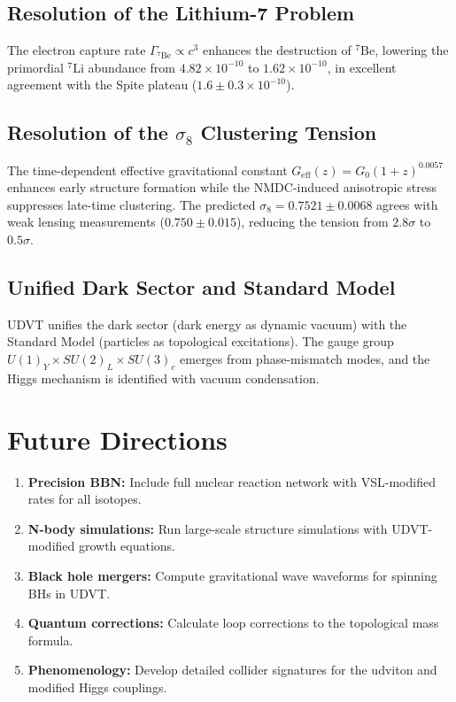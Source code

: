 \documentclass[12pt,a4paper]{book}
\theoremstyle{definition}
\theoremstyle{remark}
\begin{document}
\subsection{Resolution of the Lithium-7 Problem}

The electron capture rate $\Gamma_{^7\mathrm{Be}} \propto c^3$ enhances the destruction of $^7$Be, lowering the primordial $^7$Li abundance from $4.82 \times 10^{-10}$ to $1.62 \times 10^{-10}$, in excellent agreement with the Spite plateau ($1.6 \pm 0.3 \times 10^{-10}$).

\subsection{Resolution of the $\sigma_8$ Clustering Tension}

The time-dependent effective gravitational constant $G_{\mathrm{eff}}(z) = G_0(1+z)^{0.0057}$ enhances early structure formation while the NMDC-induced anisotropic stress suppresses late-time clustering. The predicted $\sigma_8 = 0.7521 \pm 0.0068$ agrees with weak lensing measurements ($0.750 \pm 0.015$), reducing the tension from $2.8\sigma$ to $0.5\sigma$.

\subsection{Unified Dark Sector and Standard Model}

UDVT unifies the dark sector (dark energy as dynamic vacuum) with the Standard Model (particles as topological excitations). The gauge group $U(1)_Y \times SU(2)_L \times SU(3)_c$ emerges from phase-mismatch modes, and the Higgs mechanism is identified with vacuum condensation.

\section{Future Directions}

\begin{enumerate}
    \item \textbf{Precision BBN:} Include full nuclear reaction network with VSL-modified rates for all isotopes.
    \item \textbf{N-body simulations:} Run large-scale structure simulations with UDVT-modified growth equations.
    \item \textbf{Black hole mergers:} Compute gravitational wave waveforms for spinning BHs in UDVT.
    \item \textbf{Quantum corrections:} Calculate loop corrections to the topological mass formula.
    \item \textbf{Phenomenology:} Develop detailed collider signatures for the udviton and modified Higgs couplings.
\end{enumerate}
\end{document}

